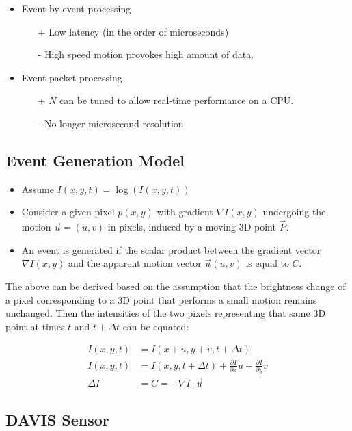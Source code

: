 \documentclass[10pt,a4paper]{scrartcl}
\begin{document}
\begin{multicols*}{2}
\begin{itemize}
\item Event-by-event processing
\begin{itemize}
\item[+] Low latency (in the order of microseconds)
\item[-] High speed motion provokes high amount of data.
\end{itemize}
\item Event-packet processing
\begin{itemize}
\item[+] $N$ can be tuned to allow real-time performance on a CPU.
\item[-] No longer microsecond resolution.
\end{itemize}
\end{itemize}

\subsection{Event Generation Model}

\begin{itemize}
\item Assume $I(x,y,t) = \log(I(x,y,t))$
\item Consider a given pixel $p(x,y)$ with gradient $\nabla I(x,y)$ undergoing the motion $\vec{u}=(u,v)$ in pixels, induced by a moving 3D point $\vec{P}$.
\item An event is generated if the scalar product between the gradient vector $\nabla I(x,y)$ and the apparent motion vector $\vec{u}(u,v)$ is equal to $C$.
\end{itemize}


The above can be derived based on the assumption that the brightness change of a pixel corresponding to a 3D point that performs a small motion remains unchanged. Then the intensities of the two pixels representing that same 3D point at times $t$ and $t+\Delta t$ can be equated:

\begin{align*}
I(x,y,t) &= I(x+u,y+v,t+\Delta t)\\
I(x,y,t)&=I(x,y,t+\Delta t)+\frac{\partial I}{\partial x}u+\frac{\partial I}{\partial y}v\\
\Delta I &= C = -\nabla I\cdot\vec{u}
\end{align*}

\subsection{DAVIS Sensor}


\end{multicols*}
\end{document}
